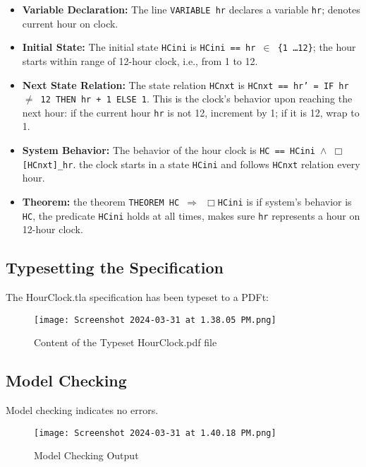 \documentclass{article}
\begin{document}
\begin{itemize}
    \item \textbf{Variable Declaration:} The line \texttt{VARIABLE hr} declares a variable \texttt{hr}; denotes current hour on clock.

    \item \textbf{Initial State:} The initial state \texttt{HCini} is \texttt{HCini == hr $\in$ \{1 \ldots 12\}}; the hour starts within range of 12-hour clock, i.e., from 1 to 12.

    \item \textbf{Next State Relation:} The state relation \texttt{HCnxt} is \texttt{HCnxt == hr' = IF hr $\neq$ 12 THEN hr + 1 ELSE 1}. This is the clock's behavior upon reaching the next hour: if the current hour \texttt{hr} is not 12, increment by 1; if it is 12, wrap to 1.

    \item \textbf{System Behavior:} The behavior of the hour clock is \texttt{HC == HCini $\land$ $\Box$[HCnxt]\_hr}. the clock starts in a state \texttt{HCini} and follows \texttt{HCnxt} relation every hour.

    \item \textbf{Theorem:} the theorem \texttt{THEOREM HC $\Rightarrow$ $\Box$HCini} is if system's behavior is \texttt{HC}, the predicate \texttt{HCini} holds at all times, makes sure \texttt{hr} represents a  hour on 12-hour clock.
\end{itemize}

\subsection*{Typesetting the Specification}
The HourClock.tla specification has been typeset to a PDFt:

\begin{figure}[H]
\centering
\texttt{[image: Screenshot 2024-03-31 at 1.38.05 PM.png]}
\caption{Content of the Typeset HourClock.pdf file}
\end{figure}

\newpage
\subsection*{Model Checking}
Model checking indicates no errors. 

\begin{figure}[H]
\centering
\texttt{[image: Screenshot 2024-03-31 at 1.40.18 PM.png]}
\caption{Model Checking Output}
\end{figure}
\end{document}
